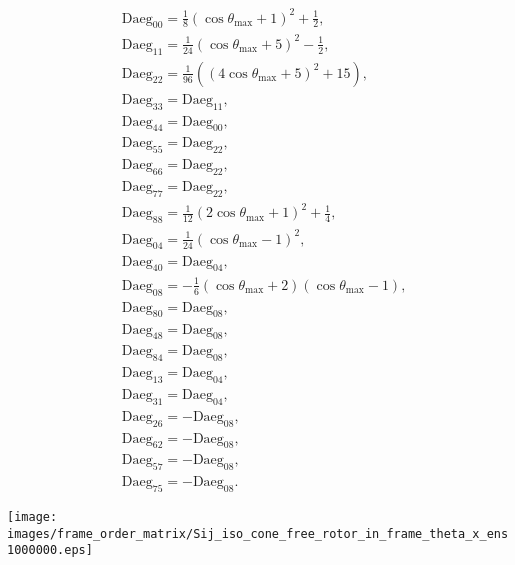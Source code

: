 \documentclass[a4paper,11pt,twoside,openright]{book}
\def\lthtmlcheckvsize{\ifdim\ht\sizebox<\vsize 
  \ifdim\wd\sizebox<\hsize\expandafter\hfill\fi \expandafter\vfill
  \else\expandafter\vss\fi}%
\begin{document}
{\newpage\clearpage
\setcounter{equation}{31}
%
\begin{subequations}\begin{align}
&\textrm{Daeg}_{00} = \tfrac{1}{8} \left( \cos\theta_{\textrm{max}}+ 1 \right)^2 + \tfrac{1}{2}, \\
&\textrm{Daeg}_{11} = \tfrac{1}{24} \left( \cos\theta_{\textrm{max}}+ 5 \right)^2 - \tfrac{1}{2}, \\
&\textrm{Daeg}_{22} = \tfrac{1}{96} \left( \left( 4\cos\theta_{\textrm{max}}+ 5 \right)^2 + 15 \right) , \\
&\textrm{Daeg}_{33} = \textrm{Daeg}_{11} , \\
&\textrm{Daeg}_{44} = \textrm{Daeg}_{00} , \\
&\textrm{Daeg}_{55} = \textrm{Daeg}_{22} , \\
&\textrm{Daeg}_{66} = \textrm{Daeg}_{22} , \\
&\textrm{Daeg}_{77} = \textrm{Daeg}_{22} , \\
&\textrm{Daeg}_{88} = \tfrac{1}{12} \left( 2\cos\theta_{\textrm{max}}+ 1 \right)^2 + \tfrac{1}{4}, \\
&\textrm{Daeg}_{04} = \tfrac{1}{24} \left( \cos\theta_{\textrm{max}}- 1 \right)^2 , \\
&\textrm{Daeg}_{40} = \textrm{Daeg}_{04} , \\
&\textrm{Daeg}_{08} = -\tfrac{1}{6} \left( \cos\theta_{\textrm{max}}+ 2 \right) \left( \cos\theta_{\textrm{max}}- 1 \right) , \\
&\textrm{Daeg}_{80} = \textrm{Daeg}_{08} , \\
&\textrm{Daeg}_{48} = \textrm{Daeg}_{08} , \\
&\textrm{Daeg}_{84} = \textrm{Daeg}_{08} , \\
&\textrm{Daeg}_{13} = \textrm{Daeg}_{04} , \\
&\textrm{Daeg}_{31} = \textrm{Daeg}_{04} , \\
&\textrm{Daeg}_{26} = -\textrm{Daeg}_{08} , \\
&\textrm{Daeg}_{62} = -\textrm{Daeg}_{08} , \\
&\textrm{Daeg}_{57} = -\textrm{Daeg}_{08} , \\
&\textrm{Daeg}_{75} = -\textrm{Daeg}_{08} .
\end{align}\end{subequations}%
\lthtmldisplayZ
\lthtmlcheckvsize\clearpage}

{\newpage\clearpage
{}%
\texttt{[image: images/frame\_order\_matrix/Sij\_iso\_cone\_free\_rotor\_in\_frame\_theta\_x\_ens1000000.eps]}%
\lthtmlpictureZ
\lthtmlcheckvsize\clearpage}
\end{document}
